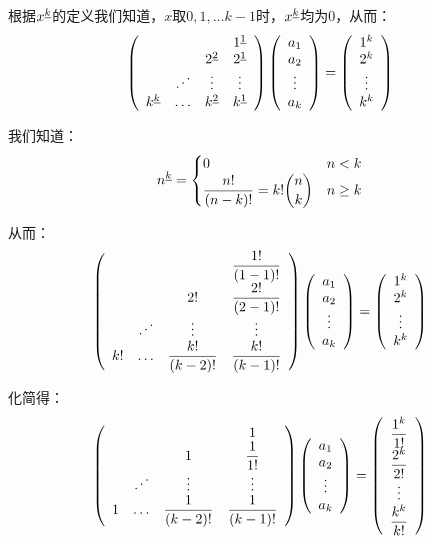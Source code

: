 \documentclass{article}
\begin{document}
\begin{CJK*}{UTF8}{gbsn}
根据${x}^{\underline{k}}$的定义我们知道，$x$取$0, 1, \ldots k - 1$时，${x}^{\underline{k}}$均为$0$，从而：
\[
\left(
\begin{array}{cccc}
								&			&								&{1}^{\underline{1}}	\\
								&			&{2}^{\underline{2}}	&{2}^{\underline{1}}	\\
								&\iddots	&\vdots							&\vdots							\\
{k}^{\underline{k}}	&\ldots		&{k}^{\underline{2}}	&{k}^{\underline{1}}	\\	
\end{array}
\right)
\left( \begin{array}{c} {a}_1 \\ {a}_2 \\ \vdots \\ {a}_{k} \end{array} \right) =
\left(
\begin{array}{c}
1^k \\ 2^k \\ \vdots \\ k^k \\
\end{array}
\right)
\]

我们知道：
\[
{n}^{\underline{k}} =
\begin{cases}
0 & n < k \\
\dfrac{n!}{(n - k)!} = k!  \dbinom{n}{k} & n \geq k
\end{cases}
\]

从而：
\[
\left(
\begin{array}{cccc}
	&			&						&\dfrac{1!}{(1 - 1)!}	\\
	&			&2!						&\dfrac{2!}{(2 - 1)!}	\\
	&\iddots	&\vdots					&\vdots					\\
k!	&\ldots		&\dfrac{k!}{(k - 2)!}	&\dfrac{k!}{(k - 1)!}	\\
\end{array}
\right)
\left( \begin{array}{c} {a}_1 \\ {a}_2 \\ \vdots \\ {a}_{k} \end{array} \right) =
\left(
\begin{array}{c}
1^k \\ 2^k \\ \vdots \\ k^k \\
\end{array}
\right)
\]

化简得：
\[
\left(
\begin{array}{cccc}
	&			&						&1						\\
	&			&1						&\dfrac{1}{1!}			\\
	&\iddots	&\vdots					&\vdots					\\
1	&\ldots		&\dfrac{1}{(k - 2)!}	&\dfrac{1}{(k - 1)!}	\\
\end{array}
\right)
\left( \begin{array}{c} {a}_1 \\ {a}_2 \\ \vdots \\ {a}_{k} \end{array} \right) =
\left(
\begin{array}{c}
\dfrac{1^k}{1!} \\ \dfrac{2^k}{2!} \\ \vdots \\ \dfrac{k^k}{k!} \\
\end{array}
\right)
\]


\end{CJK*}
\end{document}
